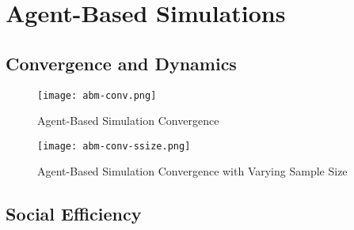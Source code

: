 \section{Agent-Based Simulations}
\label{sec:section4}  
\subsection{Convergence and Dynamics}

\begin{figure}[ht]
    \centering
    \caption{Agent-Based Simulation Convergence}
    \texttt{[image: abm-conv.png]}
    \label{fig:abm-conv} 
\end{figure}

\begin{figure}[ht] 
    \centering
    \caption{Agent-Based Simulation Convergence with Varying Sample Size}
    \texttt{[image: abm-conv-ssize.png]}
    \label{fig:abm-conv-ssize}
\end{figure}

\begin{comment}
\begin{itemize}
    \item Check Mass convergence
    \item Check distribution convergence
    \item Relate to ESS
    \item What about Dynamics??? BR
\end{itemize} 
\end{comment}
\subsection{Social Efficiency}


